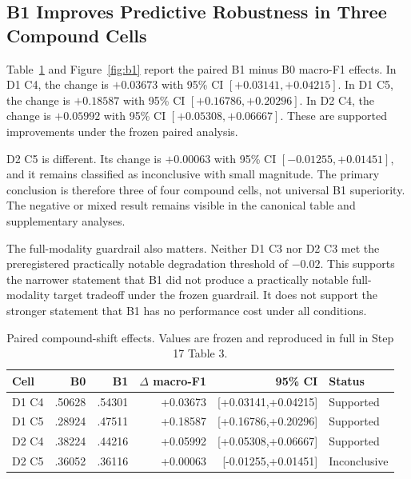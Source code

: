 \documentclass[10pt,twocolumn]{article}
\begin{document}
\subsection{B1 Improves Predictive Robustness in Three Compound Cells}
Table~\ref{tab:b1} and Figure~\ref{fig:b1} report the paired B1 minus B0 macro-F1 effects. In D1 C4, the change is $+0.03673$ with 95\% CI $[+0.03141,+0.04215]$. In D1 C5, the change is $+0.18587$ with 95\% CI $[+0.16786,+0.20296]$. In D2 C4, the change is $+0.05992$ with 95\% CI $[+0.05308,+0.06667]$. These are supported improvements under the frozen paired analysis.

D2 C5 is different. Its change is $+0.00063$ with 95\% CI $[-0.01255,+0.01451]$, and it remains classified as inconclusive with small magnitude. The primary conclusion is therefore three of four compound cells, not universal B1 superiority. The negative or mixed result remains visible in the canonical table and supplementary analyses.

The full-modality guardrail also matters. Neither D1 C3 nor D2 C3 met the preregistered practically notable degradation threshold of $-0.02$. This supports the narrower statement that B1 did not produce a practically notable full-modality target tradeoff under the frozen guardrail. It does not support the stronger statement that B1 has no performance cost under all conditions.

\begin{table}[t]
\centering\small
\caption{Paired compound-shift effects. Values are frozen and reproduced in full in Step 17 Table 3.}
\label{tab:b1}
\begin{tabular}{lrrrrl}
\toprule
Cell & B0 & B1 & $\Delta$ macro-F1 & 95\% CI & Status\\
\midrule
D1 C4 & .50628 & .54301 & +0.03673 & [+0.03141,+0.04215] & Supported\\
D1 C5 & .28924 & .47511 & +0.18587 & [+0.16786,+0.20296] & Supported\\
D2 C4 & .38224 & .44216 & +0.05992 & [+0.05308,+0.06667] & Supported\\
D2 C5 & .36052 & .36116 & +0.00063 & [-0.01255,+0.01451] & Inconclusive\\
\bottomrule
\end{tabular}
\end{table}
\end{document}
